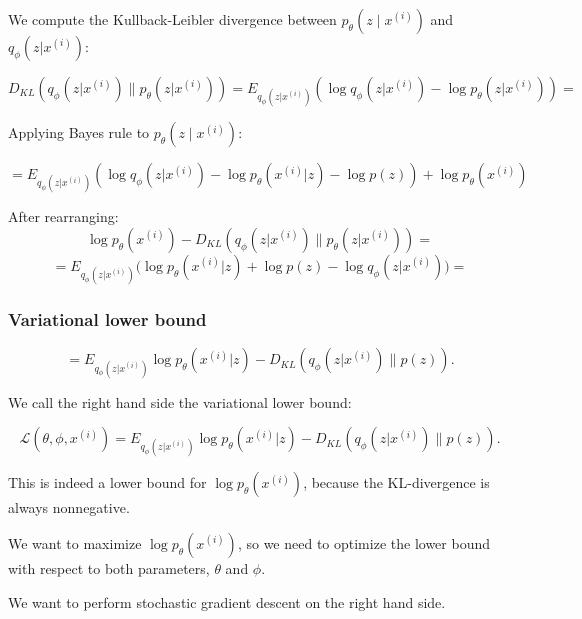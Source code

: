 \documentclass[t]{beamer}
\begin{document}
\begin{frame}
  We compute the Kullback-Leibler divergence between
  $p_{\theta}(z\mid x^{(i)})$ and $q_\phi(z|x^{(i)})$:

  \vspace{1mm}
  
  \[
    D_{KL}(q_\phi(z| x^{(i)}) \| p_\theta(z| x^{(i)})) =
    E_{q_{\phi}(z|x^{(i)})}(\log q_\phi(z|x^{(i)})-\log
    p_{\theta}(z| x^{(i)}))=
  \]
  
  \vspace{1mm}
  
  Applying Bayes rule to $p_\theta(z\mid x^{(i)})$:

  \vspace{1mm}
  
  \[
    = E_{q_{\phi}(z|x^{(i)})}(\log q_\phi(z| x^{(i)})-\log
    p_{\theta}(x^{(i)}| z)-\log p(z))+ \log
    p_{\theta}(x^{(i)})
  \]

  \vspace{2mm}
  
  After rearranging:
  \[
    \log p_{\theta}(x^{(i)})- D_{KL}(q_\phi(z| x^{(i)}) \|
    p_\theta(z| x^{(i)})) =
  \]
  \[
    = E_{q_{\phi}(z| x^{(i)})}\big(\log p_{\theta}(x^{(i)}|
    z)+ \log p(z) - \log q_\phi(z| x^{(i)})\big)=
  \]
\end{frame}

 
\begin{frame}
  \frametitle{Variational lower bound}

   \[
    = E_{q_{\phi}(z| x^{(i)})}\log p_{\theta}(x^{(i)}| z) -
    D_{KL}(q_{\phi}(z| x^{(i)})\| p(z)).
  \]

  We call the right hand side the variational lower bound:

  \[
    \mathcal{L}(\theta, \phi, x^{(i)})= E_{q_{\phi}(z|
      x^{(i)})}\log p_{\theta}(x^{(i)}| z) -
    D_{KL}(q_{\phi}(z| x^{(i)})\| p(z)).
  \]

  This is indeed a lower bound for $\log p_{\theta}(x^{(i)})$,
  because the KL-divergence is always nonnegative.

  \vspace{2mm}
  
  We want to maximize $\log p_{\theta}(x^{(i)})$, so we need to
  optimize the lower bound with respect to both parameters,
  $\theta$ and $\phi$.

  \vspace{2mm}

  We want to perform stochastic gradient descent on the
  right hand side. 
\end{frame}
\end{document}
